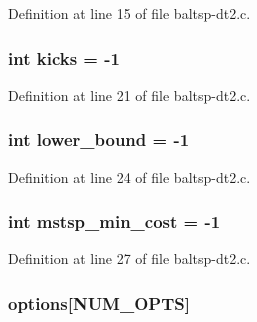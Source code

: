 Definition at line 15 of file baltsp-dt2.c.\hypertarget{bin_2baltsp-dt2_8c_b8f057ba1ad6b7f0c46f8140b25b3467}{
\subsubsection[{kicks}]{\setlength{\rightskip}{0pt plus 5cm}int {\bf kicks} = -1}}
\label{bin_2baltsp-dt2_8c_b8f057ba1ad6b7f0c46f8140b25b3467}




Definition at line 21 of file baltsp-dt2.c.\hypertarget{bin_2baltsp-dt2_8c_ed7394fd8e0c2796b26b9654fd10fd9d}{
\subsubsection[{lower\_\-bound}]{\setlength{\rightskip}{0pt plus 5cm}int {\bf lower\_\-bound} = -1}}
\label{bin_2baltsp-dt2_8c_ed7394fd8e0c2796b26b9654fd10fd9d}




Definition at line 24 of file baltsp-dt2.c.\hypertarget{bin_2baltsp-dt2_8c_79e1b33b7d744b8baacfe9c0b2e73013}{
\subsubsection[{mstsp\_\-min\_\-cost}]{\setlength{\rightskip}{0pt plus 5cm}int {\bf mstsp\_\-min\_\-cost} = -1}}
\label{bin_2baltsp-dt2_8c_79e1b33b7d744b8baacfe9c0b2e73013}




Definition at line 27 of file baltsp-dt2.c.\hypertarget{bin_2baltsp-dt2_8c_cea6a9709d519c143f30db401a0d0c72}{
\subsubsection[{options}]{ {\bf options}\mbox{[}NUM\_\-OPTS\mbox{]}}}
\label{bin_2baltsp-dt2_8c_cea6a9709d519c143f30db401a0d0c72}





